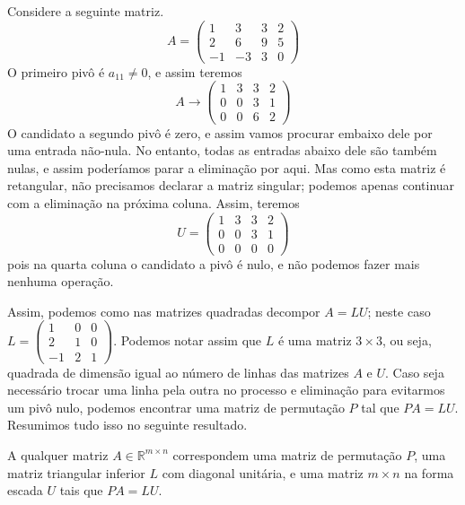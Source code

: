 Considere a seguinte matriz.
\begin{equation*}
  A = 
    \begin{pmatrix}
      1 & 3 & 3 & 2\\
      2 & 6 & 9 & 5\\
      -1 & -3 & 3 & 0
    \end{pmatrix}
\end{equation*}
O primeiro pivô é $a_{11} \ne 0$, e assim teremos
\begin{equation*}
  A \rightarrow 
    \begin{pmatrix}
      1 & 3 & 3 & 2\\
      0 & 0 & 3 & 1\\
      0 & 0 & 6 & 2
    \end{pmatrix}
\end{equation*}
O candidato a segundo pivô é zero, e assim vamos procurar embaixo dele por uma entrada não-nula. No entanto, todas as entradas abaixo dele são também nulas, e assim poderíamos parar a eliminação por aqui. Mas como esta matriz é retangular, não precisamos declarar a matriz singular; podemos apenas continuar com a eliminação na próxima coluna. Assim, teremos
\begin{equation*}
  U = 
    \begin{pmatrix}
      1 & 3 & 3 & 2\\
      0 & 0 & 3 & 1\\
      0 & 0 & 0 & 0
    \end{pmatrix}
\end{equation*}
pois na quarta coluna o candidato a pivô é nulo, e não podemos fazer mais nenhuma operação.

Assim, podemos como nas matrizes quadradas decompor $A = LU$; neste caso $L = \begin{pmatrix}
    1 & 0 & 0\\
    2 & 1 & 0\\
    -1 & 2 & 1
  \end{pmatrix}$. Podemos notar assim que $L$ é uma matriz $3\times 3$, ou seja, quadrada de dimensão igual ao número de linhas das matrizes $A$ e $U$. Caso seja necessário trocar uma linha pela outra no processo e eliminação para evitarmos um pivô nulo, podemos encontrar uma matriz de permutação $P$ tal que $PA=LU$. Resumimos tudo isso no seguinte resultado.

A qualquer matriz $A\in {\mathbb{R}}^{m\times n}$ correspondem uma matriz de permutação $P$, uma matriz triangular inferior $L$ com diagonal unitária, e uma matriz $m\times n$ na forma escada $U$ tais que $PA=LU$.

